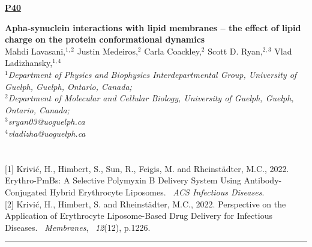 \documentclass[titlepage,oneside,openany,10pt]{book}
\newenvironment{posterabswref}[5] %
        {
        \newcommand{\posterref}{#5}
	\begin{flushright}
                \underline{\textbf{#4}}
        \end{flushright}
        \textbf{#1}\\%
        #2\\%
        \textit{#3}\\\\%
        }
        {
        \vspace{0.5cm}
        \\\noindent \posterref \\ \noindent\rule{15cm}{0.5pt}%
        }
\begin{document}
\begin{posterabswref}
    {Apha-synuclein interactions with lipid membranes -- the effect of lipid charge on the protein conformational dynamics}
    {Mahdi Lavasani,$^{1,2}$ Justin Medeiros,$^{2}$ Carla Coackley,$^{2}$ Scott D. Ryan,$^{2,3}$ Vlad Ladizhansky,$^{1,4}$}
    {
    $^1$Department of Physics and Biophysics Interdepartmental Group, University of Guelph, Guelph, Ontario, Canada;\\
    $^2$Department of Molecular and Cellular Biology, University of Guelph, Guelph, Ontario, Canada;\\
    $^3$sryan03@uoguelph.ca\\
    $^4$vladizha@uoguelph.ca
    }
    {P40}
    {
    {[1]} Krivić, H., Himbert, S., Sun, R., Feigis, M. and Rheinstädter, M.C., 2022. Erythro-PmBs: A Selective Polymyxin B Delivery System Using Antibody-Conjugated Hybrid Erythrocyte Liposomes.~ \emph{ACS Infectious Diseases}.\\
    {[2]} Krivić, H., Himbert, S. and Rheinst\"{a}dter, M.C., 2022. Perspective on the Application of Erythrocyte Liposome-Based Drug Delivery for Infectious Diseases.~ \emph{Membranes},~ \emph{12}(12), p.1226.
    }

\end{posterabswref}
\end{document}

